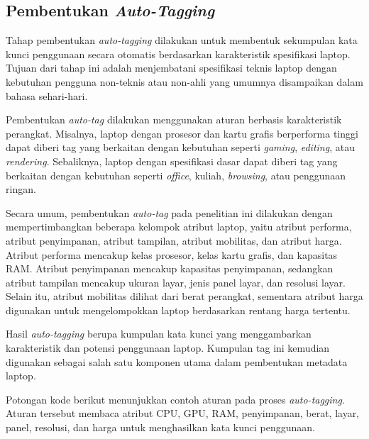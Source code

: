 \subsection{Pembentukan \textit{Auto-Tagging}}
Tahap pembentukan \textit{auto-tagging} dilakukan untuk membentuk sekumpulan kata kunci penggunaan secara otomatis berdasarkan karakteristik spesifikasi laptop. Tujuan dari tahap ini adalah menjembatani spesifikasi teknis laptop dengan kebutuhan pengguna non-teknis atau non-ahli yang umumnya disampaikan dalam bahasa sehari-hari.

Pembentukan \textit{auto-tag} dilakukan menggunakan aturan berbasis karakteristik perangkat. Misalnya, laptop dengan prosesor dan kartu grafis berperforma tinggi dapat diberi tag yang berkaitan dengan kebutuhan seperti \textit{gaming}, \textit{editing}, atau \textit{rendering}. Sebaliknya, laptop dengan spesifikasi dasar dapat diberi tag yang berkaitan dengan kebutuhan seperti \textit{office}, kuliah, \textit{browsing}, atau penggunaan ringan.

Secara umum, pembentukan \textit{auto-tag} pada penelitian ini dilakukan dengan mempertimbangkan beberapa kelompok atribut laptop, yaitu atribut performa, atribut penyimpanan, atribut tampilan, atribut mobilitas, dan atribut harga. Atribut performa mencakup kelas prosesor, kelas kartu grafis, dan kapasitas RAM. Atribut penyimpanan mencakup kapasitas penyimpanan, sedangkan atribut tampilan mencakup ukuran layar, jenis panel layar, dan resolusi layar. Selain itu, atribut mobilitas dilihat dari berat perangkat, sementara atribut harga digunakan untuk mengelompokkan laptop berdasarkan rentang harga tertentu.

Hasil \textit{auto-tagging} berupa kumpulan kata kunci yang menggambarkan karakteristik dan potensi penggunaan laptop. Kumpulan tag ini kemudian digunakan sebagai salah satu komponen utama dalam pembentukan metadata laptop.

Potongan kode berikut menunjukkan contoh aturan pada proses \textit{auto-tagging}. Aturan tersebut membaca atribut CPU, GPU, RAM, penyimpanan, berat, layar, panel, resolusi, dan harga untuk menghasilkan kata kunci penggunaan.

